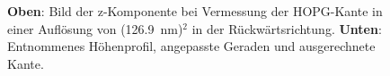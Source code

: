 \documentclass[12pt,a4paper]{article}
\begin{document}
\begin{figure}
\caption{\textbf{Oben}: Bild der z-Komponente bei Vermessung der HOPG-Kante in einer Auflösung von (\SI{126,9}{nm})$^2$ in der Rückwärtsrichtung. \textbf{Unten}: Entnommenes Höhenprofil, angepasste Geraden und ausgerechnete Kante.}
\end{figure}
\end{document}
